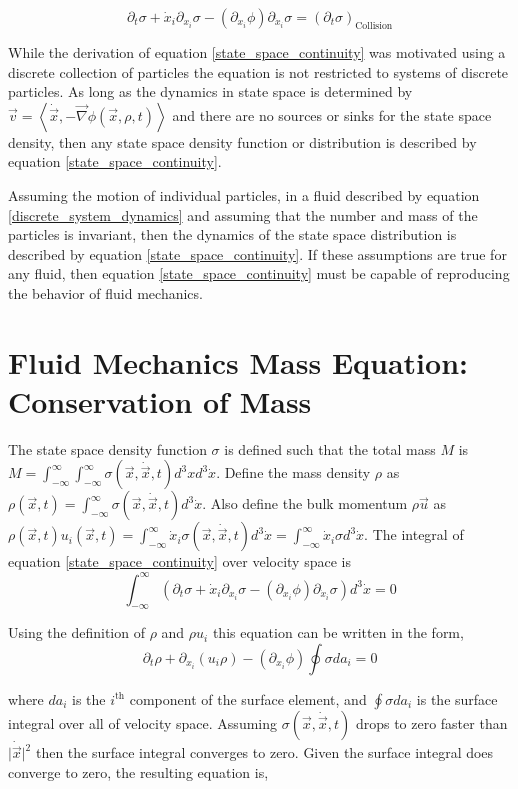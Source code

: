 \documentclass[%
 twocolumn,
 amsmath,amssymb,
 aps,
]{revtex4-1}
\newcommand{\dvec}[1]{\dot{\vec{#1}}}
\newcommand{\grad}{\vec{\nabla}}
\newcommand{\intVdot}[1]{\int_{-\infty}^{\infty} #1 d^3\dot{x}}
\newcommand{\intVVdot}[1]{\int_{-\infty}^{\infty}\int_{-\infty}^{\infty} #1 d^3xd^3\dot{x}}
\begin{document}
\[
\partial_t \sigma + \dot{x}_i\partial_{x_i}\sigma-\left(\partial_{x_i}\phi\right)\partial_{\dot{x}_i}\sigma=\left(\partial_t \sigma\right)_{\text{Collision}}
\]

While the derivation of equation \eqref{state_space_continuity} was motivated using a discrete collection of particles the equation is not restricted to systems of discrete particles. As long as the dynamics in state space is determined by $\vec{v}=\left\langle\dvec{x}, -\grad\phi(\vec{x}, \rho, t)\right\rangle$ and there are no sources or sinks for the state space density, then any state space density function or distribution is described by equation \eqref{state_space_continuity}.

Assuming the motion of individual particles, in a fluid described by equation \eqref{discrete_system_dynamics} and assuming that the number and mass of the particles is invariant, then the dynamics of the state space distribution is described by equation \eqref{state_space_continuity}. If these assumptions are true for any fluid, then equation \eqref{state_space_continuity} must be capable of reproducing the behavior of fluid mechanics.



\section{Fluid Mechanics Mass Equation: Conservation of Mass}
The state space density function $\sigma$ is defined such that the total mass $M$ is $M=\intVVdot{\sigma(\vec{x}, \dvec{x}, t)}$. Define the mass density $\rho$ as $\rho(\vec{x}, t)=\intVdot{\sigma(\vec{x}, \dvec{x}, t)}$. Also define the bulk momentum $\rho\vec{u}$ as $\rho(\vec{x}, t) u_i(\vec{x}, t)=\intVdot{\dot{x}_i\sigma(\vec{x}, \dvec{x}, t)}=\intVdot{\dot{x}_i\sigma}$. The integral of equation \eqref{state_space_continuity} over velocity space is
\[
\intVdot{\left(\partial_t \sigma + \dot{x}_i\partial_{x_i}\sigma-\left(\partial_{x_i}\phi\right)\partial_{\dot{x}_i}\sigma\right)}=0
\]

Using the definition of $\rho$ and $\rho u_i$ this equation can be written in the form,
\[
\partial_t\rho + \partial_{x_i}\left(u_i\rho\right)-\left(\partial_{x_i}\phi\right)\oint{\sigma da_i}=0
\]

where $da_i$ is the $i^{\text{th}}$ component of the surface element, and $\oint{\sigma da_i}$ is the surface integral over all of velocity space. Assuming $\sigma(\vec{x}, \dvec{x}, t)$ drops to zero faster than $\lvert\dvec{x}\rvert^2$ then the surface integral converges to zero. Given the surface integral does converge to zero, the resulting equation is, 
\end{document}
